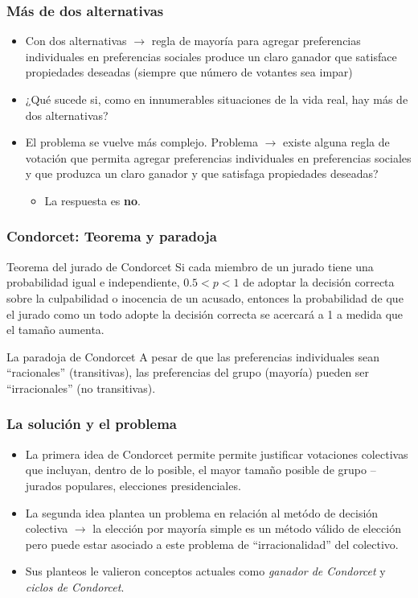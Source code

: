 \documentclass[14pt,aspectratio=169]{beamer}
\begin{document}
\begin{frame}\frametitle{Más de dos alternativas}
\begin{itemize}
\item Con dos alternativas $\longrightarrow$ regla de mayoría para
  agregar preferencias individuales en preferencias sociales produce
  un claro ganador que satisface propiedades deseadas (siempre que
  número de votantes sea impar)
\item ¿Qué sucede si, como en innumerables situaciones de la vida
  real, hay más de dos alternativas?
\item El problema se vuelve más complejo. Problema $\longrightarrow$
  existe alguna regla de votación que permita agregar preferencias
  individuales en preferencias sociales y que produzca un claro
  ganador y que satisfaga propiedades deseadas?
\begin{itemize}\itemsep 5pt \medskip
\item La respuesta es \textbf{no}.
\end{itemize}
\end{itemize}
\end{frame}


\begin{frame}\frametitle{Condorcet: Teorema y paradoja}
\begin{block}{Teorema del jurado de Condorcet}
Si cada miembro de un jurado tiene una probabilidad igual e
independiente, $0.5<p<1$ de adoptar la decisión correcta sobre la
culpabilidad o inocencia de un acusado, entonces la probabilidad de
que el jurado como un todo adopte la decisión correcta se acercará a 1
a medida que el tamaño aumenta.
\end{block}
\begin{block}{La paradoja de Condorcet}
A pesar de que las preferencias individuales sean ``racionales''
(transitivas), las preferencias del grupo (mayoría) pueden ser
``irracionales'' (no transitivas). 
\end{block}
\end{frame}

\begin{frame}\frametitle{La solución y el problema}
\begin{itemize}
\item La primera idea de Condorcet permite permite justificar
  votaciones colectivas que incluyan, dentro de lo posible, el mayor
  tamaño posible de grupo --jurados populares, elecciones
  presidenciales.
\item La segunda idea plantea un problema en relación al metódo de
  decisión colectiva $\longrightarrow$ la elección por mayoría simple
  es un método válido de elección pero puede estar asociado a este
  problema de ``irracionalidad'' del colectivo.
\item Sus planteos le valieron conceptos actuales como \textit{ganador
    de Condorcet} y \textit{ciclos de Condorcet}.
\end{itemize}
\end{frame}
\end{document}
